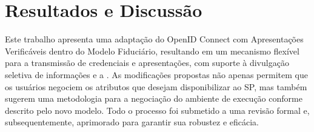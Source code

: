 \section{Resultados e Discussão} \label{section:resultados-discussoes}

Este trabalho apresenta uma adaptação do OpenID Connect com Apresentações Verificáveis dentro do Modelo Fiduciário, resultando em um mecanismo flexível para a transmissão de credenciais e apresentações, com suporte à divulgação seletiva de informações e a . As modificações propostas não apenas permitem que os usuários negociem os atributos que desejam disponibilizar ao \acs{SP}, mas também sugerem uma metodologia para a negociação do ambiente de execução conforme descrito pelo novo modelo. Todo o processo foi submetido a uma revisão formal e, subsequentemente, aprimorado para garantir sua robustez e eficácia.
